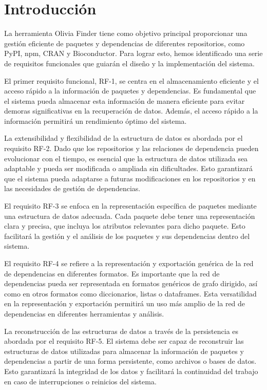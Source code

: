 
\section{Introducción}

La herramienta Olivia Finder tiene como objetivo principal proporcionar una gestión eficiente de paquetes 
y dependencias de diferentes repositorios, como PyPI, npm, CRAN y Bioconductor. Para lograr esto, hemos 
identificado una serie de requisitos funcionales que guiarán el diseño y la implementación del sistema.

El primer requisito funcional, RF-1, se centra en el almacenamiento eficiente y el acceso rápido a la 
información de paquetes y dependencias. Es fundamental que el sistema pueda almacenar esta información 
de manera eficiente para evitar demoras significativas en la recuperación de datos. Además, el acceso 
rápido a la información permitirá un rendimiento óptimo del sistema.

La extensibilidad y flexibilidad de la estructura de datos es abordada por el requisito RF-2. Dado 
que los repositorios y las relaciones de dependencia pueden evolucionar con el tiempo, es esencial que 
la estructura de datos utilizada sea adaptable y pueda ser modificada o ampliada sin dificultades. Esto 
garantizará que el sistema pueda adaptarse a futuras modificaciones en los repositorios y en las 
necesidades de gestión de dependencias.

El requisito RF-3 se enfoca en la representación específica de paquetes mediante una estructura de 
datos adecuada. Cada paquete debe tener una representación clara y precisa, que incluya los atributos
relevantes para dicho paquete. Esto facilitará la gestión y el análisis de los paquetes y sus dependencias 
dentro del sistema.

El requisito RF-4 se refiere a la representación y exportación genérica de la red de dependencias 
en diferentes formatos. Es importante que la red de dependencias pueda ser representada en formatos 
genéricos de grafo dirigido, así como en otros formatos como diccionarios, listas o dataframes. 
Esta versatilidad en la representación y exportación permitirá un uso más amplio de la red de 
dependencias en diferentes herramientas y análisis.

La reconstrucción de las estructuras de datos a través de la persistencia es abordada por el 
requisito RF-5. El sistema debe ser capaz de reconstruir las estructuras de datos utilizadas 
para almacenar la información de paquetes y dependencias a partir de una forma persistente, como 
archivos o bases de datos. Esto garantizará la integridad de los datos y facilitará la continuidad 
del trabajo en caso de interrupciones o reinicios del sistema.

